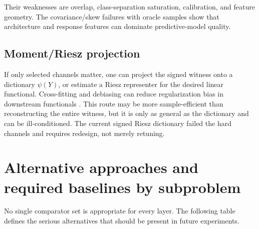\documentclass[10pt]{article}
\begin{document}
Their weaknesses are overlap, class-separation saturation, calibration, and feature geometry. The covariance/skew failures with oracle samples show that architecture and response features can dominate predictive-model quality.

\subsection{Moment/Riesz projection}

If only selected channels matter, one can project the signed witness onto a dictionary \(\psi(Y)\), or estimate a Riesz representer for the desired linear functional. Cross-fitting and debiasing can reduce regularization bias in downstream functionals \cite{chernozhukov2022}. This route may be more sample-efficient than reconstructing the entire witness, but it is only as general as the dictionary and can be ill-conditioned. The current signed Riesz dictionary failed the hard channels and requires redesign, not merely retuning.

\section{Alternative approaches and required baselines by subproblem}

No single comparator set is appropriate for every layer. The following table defines the serious alternatives that should be present in future experiments.
\end{document}
